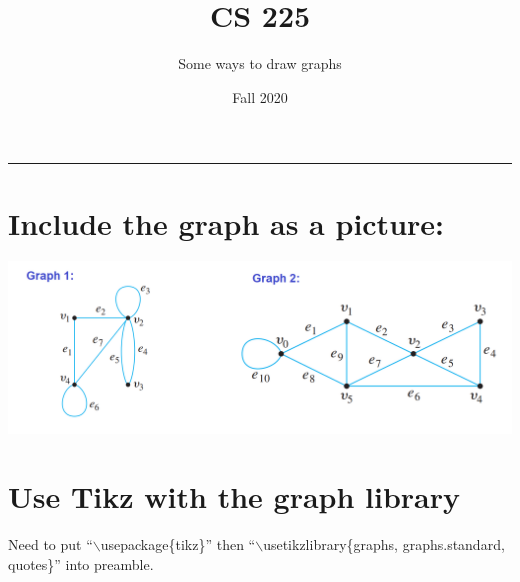 \documentclass[11pt]{article}
\title{CS 225}
\author{Some ways to draw graphs}
\date{Fall 2020}
\begin{document}
\maketitle
\hrule

\bigskip
\section*{Include the graph as a picture:}

\includegraphics[scale=0.3]{graphs_updated.png}

\section*{Use Tikz with the graph library}

Need to put ``{$\backslash$}usepackage\{tikz\}'' then ``{$\backslash$}usetikzlibrary\{graphs, graphs.standard, 
quotes\}'' into preamble. 

\begin{center}
\end{center}
\end{document}
